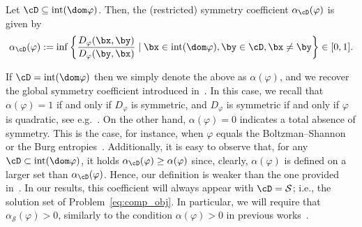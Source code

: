 \documentclass[11pt]{amsart}
\newcommand{\es}[1]{{\color{blue}#1}}
\newcommand{\jc}[1]{{\color{red}#1}}
\begin{document}
\begin{definition}\label{def:alpha(h)} Let $\cD\subseteq\mathrm{int}(\dom \varphi)$. Then, the (restricted) symmetry coefficient $\alpha_\cD(\varphi)$ is given by
\begin{equation}\label{eq:alpha(h)}
\alpha_\cD(\varphi):=\inf \left\{\frac{D_{\varphi}(\bx,\by)}{D_{\varphi}(\by, \bx)} \mid \bx \in \mathrm{int}(\dom \varphi), \by\in \cD, \bx\neq\by \right\}\in[0, 1].
\end{equation}
\end{definition}
If $\cD=\mathrm{int} (\dom \varphi)$ then we simply denote the above as $\alpha(\varphi)$, and we recover the global symmetry coefficient introduced in~\cite{bauschke2017descent}. In this case, we recall that $\alpha(\varphi)=1$ if and only if $D_{\varphi}$ is symmetric, and $D_{\varphi}$ is symmetric if and only if $\varphi$ is quadratic, see e.g.~\cite{bauschke2017descent}. On the other hand, $\alpha(\varphi)=0$ indicates a total absence of symmetry. This is the case, for instance, when $\varphi$ equals the Boltzman--Shannon or the Burg entropies~\cite{bauschke2017descent}.  Additionally, it is easy to observe that, for any $\cD\subset \mathrm{int}(\dom \varphi)$, it holds $\alpha_\cD(\varphi)\geq \alpha(\varphi)$ since, clearly, $\alpha(\varphi)$ is defined on a larger set than $\alpha_\cD(\varphi)$. Hence, our definition is weaker than the one provided in~\cite{bauschke2017descent}. In our results, this coefficient will always appear with $\cD=\mathcal{S}$; i.e., the solution set of Problem~\cref{eq:comp_obj}. In particular, we will require that $\alpha_\mathcal{S}(\varphi)>0$, similarly to the condition $\alpha(\varphi)>0$ in previous works~\cite{Bauschke2019,bauschke2017descent,Bolte2018}. 
\end{document}
